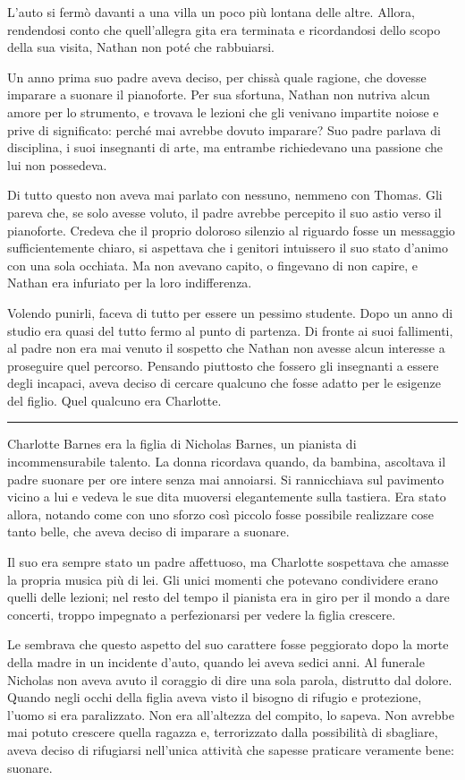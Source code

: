 \documentclass[a4paper,oneside,11pt]{memoir}
\begin{document}
L'auto si fermò davanti a una villa un poco più lontana delle altre. Allora,
rendendosi conto che quell'allegra gita era terminata e ricordandosi dello scopo
della sua visita, Nathan non poté che rabbuiarsi.

Un anno prima suo padre aveva deciso, per chissà quale ragione, che dovesse
imparare a suonare il pianoforte. Per sua sfortuna, Nathan non nutriva alcun
amore per lo strumento, e trovava le lezioni che gli venivano impartite noiose e
prive di significato: perché mai avrebbe dovuto imparare? Suo padre parlava di
disciplina, i suoi insegnanti di arte, ma entrambe richiedevano una passione che
lui non possedeva.

Di tutto questo non aveva mai parlato con nessuno, nemmeno con Thomas. Gli
pareva che, se solo avesse voluto, il padre avrebbe percepito il suo astio verso
il pianoforte. Credeva che il proprio doloroso silenzio al riguardo fosse un
messaggio sufficientemente chiaro, si aspettava che i genitori intuissero il suo
stato d'animo con una sola occhiata. Ma non avevano capito, o fingevano di non
capire, e Nathan era infuriato per la loro indifferenza.

Volendo punirli, faceva di tutto per essere un pessimo studente. Dopo un anno di
studio era quasi del tutto fermo al punto di partenza. Di fronte ai suoi
fallimenti, al padre non era mai venuto il sospetto che Nathan non avesse alcun
interesse a proseguire quel percorso. Pensando piuttosto che fossero gli
insegnanti a essere degli incapaci, aveva deciso di cercare qualcuno che fosse
adatto per le esigenze del figlio. Quel qualcuno era Charlotte.

\plainbreak{1}

Charlotte Barnes era la figlia di Nicholas Barnes, un pianista di
incommensurabile talento. La donna ricordava quando, da bambina, ascoltava il
padre suonare per ore intere senza mai annoiarsi. Si rannicchiava sul pavimento
vicino a lui e vedeva le sue dita muoversi elegantemente sulla tastiera. Era
stato allora, notando come con uno sforzo così piccolo fosse possibile
realizzare cose tanto belle, che aveva deciso di imparare a suonare.

Il suo era sempre stato un padre affettuoso, ma Charlotte sospettava che amasse
la propria musica più di lei. Gli unici momenti che potevano condividere erano
quelli delle lezioni; nel resto del tempo il pianista era in giro per il mondo a
dare concerti, troppo impegnato a perfezionarsi per vedere la figlia crescere.

Le sembrava che questo aspetto del suo carattere fosse peggiorato dopo la morte
della madre in un incidente d'auto, quando lei aveva sedici anni. Al funerale
Nicholas non aveva avuto il coraggio di dire una sola parola, distrutto dal
dolore. Quando negli occhi della figlia aveva visto il bisogno di rifugio e
protezione, l'uomo si era paralizzato. Non era all'altezza del compito, lo
sapeva. Non avrebbe mai potuto crescere quella ragazza e, terrorizzato dalla
possibilità di sbagliare, aveva deciso di rifugiarsi nell'unica attività che
sapesse praticare veramente bene: suonare.
\end{document}
